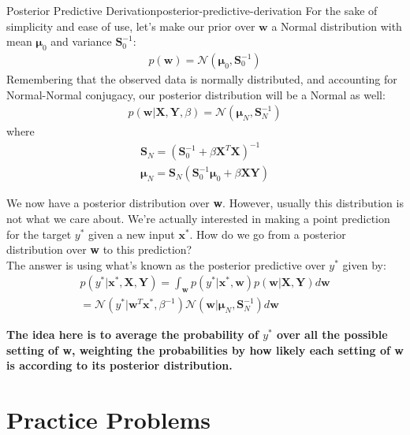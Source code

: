 \begin{derivation}{Posterior Predictive Derivation}{posterior-predictive-derivation}
    For the sake of simplicity and ease of use, let's make our prior over $\textbf{w}$ a Normal distribution with mean $\boldsymbol{\mu}_{0}$ and variance $\boldsymbol{S}_{0}^{-1}$:
    \begin{align*}
        p(\textbf{w}) = \mathcal{N}(\boldsymbol{\mu}_{0}, \boldsymbol{S}_{0}^{-1})
    \end{align*}
    Remembering that the observed data is normally distributed, and accounting for Normal-Normal conjugacy, our posterior distribution will be a Normal as well:
    \begin{align*}
        p(\textbf{w}|\textbf{X},\textbf{Y}, \beta) = \mathcal{N}(\boldsymbol{\mu}_{N}, \boldsymbol{S}_{N}^{-1})
    \end{align*}
    where
    \begin{align*}
        \boldsymbol{S}_{N} = (\boldsymbol{S}_{0}^{-1} + \beta\textbf{X}^{T}\textbf{X})^{-1} \\
        \boldsymbol{\mu}_{N} = \boldsymbol{S}_{N}(\boldsymbol{S}_{0}^{-1}\boldsymbol{\mu}_{0} + \beta\textbf{X}\textbf{Y})
    \end{align*}

    We now have a posterior distribution over \textbf{w}. However, usually this distribution is not what we care about. We're actually interested in making a point prediction for the target $y^{*}$ given a new input $\textbf{x}^{*}$. How do we go from a posterior distribution over \textbf{w} to this prediction? \\

    The answer is using what's known as the posterior predictive over $y^{*}$ given by:
    \begin{equation}
    \begin{split}
        p(y^{*} | \textbf{x}^{*}, \textbf{X}, \textbf{Y}) = \int_{\textbf{w}} p(y^{*} | \textbf{x}^{*}, \textbf{w})p(\textbf{w} | \textbf{X}, \textbf{Y})d\textbf{w} \\
        = \mathcal{N}(y^{*} | \textbf{w}^{T}\textbf{x}^{*}, \beta^{-1})\mathcal{N}(\textbf{w} | \boldsymbol{\mu}_{N}, \boldsymbol{S}_{N}^{-1})d\textbf{w}
    \end{split}
    \end{equation}
\end{derivation}

\textbf{The idea here is to average the probability of $y^{*}$ over all the possible setting of \textbf{w}, weighting the probabilities by how likely each setting of \textbf{w} is according to its posterior distribution.}

\section{Practice Problems}